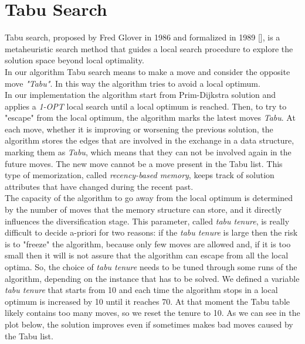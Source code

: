 \section{Tabu Search}
Tabu search, proposed by Fred Glover in 1986 and formalized in 1989 [\cite{glover1989tabu}], is a metaheuristic search method that guides a local search procedure to explore the solution space beyond local optimality. \\
In our algorithm Tabu search means to make a move and consider the opposite move \textit{"Tabu"}. In this way the algorithm tries to avoid a local optimum.\\
In our implementation the algorithm start from Prim-Dijkstra solution and applies a \textit{1-OPT} local search until a local optimum is reached. Then, to try to "escape" from the local optimum, the algorithm marks the latest moves \textit{Tabu}. At each move, whether it is improving or worsening the previous solution, the algorithm stores the edges that are involved in the exchange in a data structure, marking them as \textit{Tabu}, which means that they can not be involved again in the future moves. The new move cannot be a move present in the Tabu list. This type of memorization, called \textit{recency-based memory}, keeps track of solution attributes that have changed during the recent past.\\
The capacity of the algorithm to go away from the local optimum is determined by the number of moves that the memory structure can store, and it directly influences the diversification stage. This parameter, called \textit{tabu tenure}, is really difficult to decide a-priori for two reasons: if the \textit{tabu tenure} is large then the risk is to "freeze" the algorithm, because only few moves are allowed and, if it is too small then it will is not assure that the algorithm can escape from all the local optima. So, the choice of \textit{tabu tenure} needs to be tuned through some runs of the algorithm, depending on the instance that has to be solved. We defined a variable \textit{tabu tenure} that starts from 10 and each time the algorithm stops in a local optimum is increased by 10 until it reaches 70. At that moment the Tabu table likely contains too many moves, so we reset the tenure to 10. As we can see in the plot below, the solution improves even if sometimes makes bad moves caused by the Tabu list.

